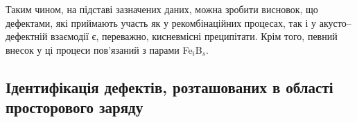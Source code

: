 Таким чином, на підставі зазначених даних, можна зробити висновок,
що дефектами, які приймають участь як у рекомбінаційних процесах, так і у акусто--дефектній взаємодії є, переважно,
кисневмісні преципітати.
Крім того, певний внесок у ці процеси пов'язаний з парами Fe$_i$B$_s$.


\subsection{Ідентифікація дефектів, розташованих в області просторового \mbox{заряду}}




